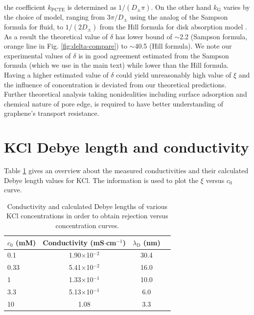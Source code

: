 \documentclass[journal=langd5,email=true, hyperref=true, keywords=false]{achemso}
\begin{document}
the coefficient $k_{\mathrm{PCTE}}$ is determined as
$1/(D_{\mathrm{\pm}} \pi)$. On the other hand $k_{\mathrm{G}}$ varies
by the choice of model, ranging from $3 \pi / D_{\mathrm{\pm}}$ using
the analog of the Sampson formula for
fluid\cite{Roscoe_1949,Celebi_2014}, to $1/(2 D_{\mathrm{\pm}})$ from
the Hill formula for disk absorption model
\cite{Hill_1975,Grebenkov_2018}. As a result the theoretical value of
$\delta$ has lower bound of $\sim$2.2 (Sampson formula, orange line in
Fig. \ref{fig:delta-compare}) to $\sim$40.5 (Hill formula). We note
our experimental values of $\delta$ is in good agreement estimated
from the Sampson formula (which we use in the main text) while lower
than the Hill formula. Having a higher estimated value of $\delta$
could yield unreasonably high value of $\xi$ and the influence of
concentration is deviated from our theoretical predictions. Further
theoretical analysis taking nonidealities including surface adsorption
and chemical nature of pore edge, is required to have better
understanding of graphene's transport resistance.






\section{KCl Debye length and conductivity}
\label{sec:debye}
Table \ref{tab:debye} gives an overview about the measured
conductivities and their calculated Debye length values for KCl. The
information is used to plot the $\xi$ versus $c_{0}$ curve.

\begin{table}[htbp]
  \centering
  \begin{tabular}{lccc}
    \hline
    $c_{0}$ (mM) & Conductivity (mS$\cdot$cm$^{-1}$) & $\lambda_{\mathrm{D}}$ (nm)\\
    \hline
    0.1&        1.90$\times$10$^{-2}$ &        30.4\\
    0.33&       5.41$\times$10$^{-2}$ & 16.0\\
    1   &1.33$\times$10$^{-1}$ & 10.0\\
    3.3&     5.13$\times$10$^{-1}$ &  6.0\\
    10&      1.08    &3.3\\
    \hline
  \end{tabular}
  \caption{Conductivity and calculated Debye lengths of various KCl
    concentrations in order to obtain rejection versus
    concentration curves. }
  \label{tab:debye}
\end{table}
\end{document}
